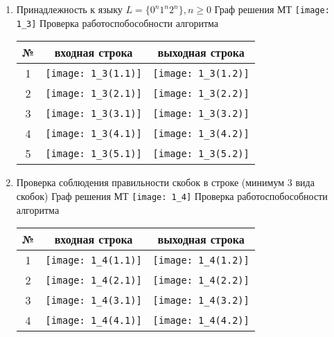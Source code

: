 \documentclass[a4paper, 12pt]{article}
\begin{document}
\begin{enumerate}
  \item Принадлежность к языку $L = \{ 0^n1^n2^n \}, n \ge 0$
   \newline
    Граф решения МТ
    \newline
    \texttt{[image: 1\_3]}
    \newline
    Проверка работоспобособности алгоритма
    \newline
    \begin{tabular}{|*{3}{c|}}
       \hline
       № & входная строка & выходная строка \\
       \hline
       1 & \texttt{[image: 1\_3(1.1)]} & \texttt{[image: 1\_3(1.2)]} \\ 
       \hline
       2 & \texttt{[image: 1\_3(2.1)]} & \texttt{[image: 1\_3(2.2)]} \\ 
       \hline
       3 & \texttt{[image: 1\_3(3.1)]} & \texttt{[image: 1\_3(3.2)]} \\
       \hline
       4 & \texttt{[image: 1\_3(4.1)]} & \texttt{[image: 1\_3(4.2)]} \\
       \hline
       5 & \texttt{[image: 1\_3(5.1)]} & \texttt{[image: 1\_3(5.2)]} \\
       \hline
    \end{tabular}
  
  \item Проверка соблюдения правильности скобок в строке (минимум 3 вида скобок) 
   \newline
    Граф решения МТ
    \newline
    \texttt{[image: 1\_4]}
    \newline
    Проверка работоспобособности алгоритма
    \newline
    \begin{tabular}{|*{3}{c|}}
       \hline
       № & входная строка & выходная строка \\
       \hline
       1 & \texttt{[image: 1\_4(1.1)]} & \texttt{[image: 1\_4(1.2)]} \\ 
       \hline
       2 & \texttt{[image: 1\_4(2.1)]} & \texttt{[image: 1\_4(2.2)]} \\ 
       \hline
       3 & \texttt{[image: 1\_4(3.1)]} & \texttt{[image: 1\_4(3.2)]} \\
       \hline
       4 & \texttt{[image: 1\_4(4.1)]} & \texttt{[image: 1\_4(4.2)]} \\
       \hline
    \end{tabular}
  

\end{enumerate}
\end{document}
